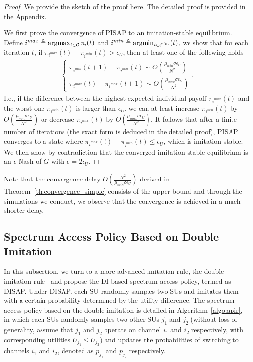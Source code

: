 \documentclass[12pt, onecolumn]{IEEEtran}
\theoremstyle{plain}
\theoremstyle{definition}
\newcommand{\argmax}{\operatornamewithlimits{argmax}}
\newcommand{\argmin}{\operatornamewithlimits{argmin}}
\begin{document}
\begin{proof}
We provide the sketch of the proof here. The detailed proof is provided in the Appendix.

We first prove the convergence of PISAP to an imitation-stable equilibrium. Define $i^{max}\triangleq\argmax_{i\in{\cal C}} \pi_i(t)$ and $i^{min}\triangleq\argmin_{i\in{\cal C}} \pi_i(t)$, we show that for each iteration $t$, if $\pi_{i^{max}}(t)-\pi_{i^{min}}(t)>\epsilon_U$, then at least one of the following holds
\begin{eqnarray*}
\begin{cases}
\pi_{i^{min}}(t+1)-\pi_{i^{min}}(t) \sim O(\frac{\mu_{min}\sigma\epsilon_U}{N^2}) \\
\pi_{i^{max}}(t)-\pi_{i^{max}}(t+1) \sim O(\frac{\mu_{max}\sigma\epsilon_U}{N^2})
\end{cases}.
\end{eqnarray*}
I.e., if the difference between the highest expected individual payoff $\pi_{i^{max}}(t)$ and the worst one $\pi_{i^{min}}(t)$ is larger than $\epsilon_U$, we can at least increase $\pi_{i^{min}}(t)$ by $O(\frac{\mu_{min}\sigma\epsilon_U}{N^2})$ or decrease $\pi_{i^{max}}(t)$ by $O(\frac{\mu_{max}\sigma\epsilon_U}{N^2})$. It follows that after a finite number of iterations (the exact form is deduced in the detailed proof), PISAP converges to a state where $\pi_{i^{max}}(t)-\pi_{i^{min}}(t)\le\epsilon_U$, which is imitation-stable. We then show by contradiction that the converged imitation-stable equilibrium is an $\epsilon$-Nash of $G$ with $\epsilon=2\epsilon_U$.
\end{proof}

Note that the convergence delay $O(\frac{N^2}{\mu_{min}\sigma\epsilon_U})$ derived in Theorem~\ref{th:convergence_simple} consists of the upper bound and through the simulations we conduct, we observe that the convergence is achieved in a much shorter delay.

\subsection{Spectrum Access Policy Based on Double Imitation}

In this subsection, we turn to a more advanced imitation rule, the double imitation rule~\cite{Schlag99} and propose the DI-based spectrum access policy, termed as DISAP. Under DISAP, each SU randomly samples two SUs and imitates them with a certain probability determined by the utility difference. The spectrum access policy based on the double imitation is detailed in Algorithm~\ref{algo:apir}, in which each SUs randomly samples two other SUs $j_1$ and $j_2$ (without loss of generality, assume that $j_1$ and $j_2$ operate on channel $i_1$ and $i_2$ respectively, with corresponding utilities $U_{j_1}\le U_{j_2}$) and updates the probabilities of switching to channels $i_1$ and $i_2$, denoted as $p_{j_1}$ and $p_{j_2}$ respectively.
\end{document}
